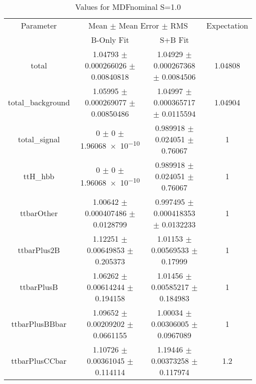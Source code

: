 \begin{table}
\centering
\caption{Values for MDFnominal S=1.0}
\begin{tabular}{cccc}
\toprule
Parameter & \multicolumn{2}{c}{Mean $\pm$ Mean Error $\pm$ RMS} & Expectation\\
 & B-Only Fit & S+B Fit & \\
\midrule
total & \num{1.04793} $\pm$ \num{0.000266026} $\pm$ \num{0.00840818} & \num{1.04929} $\pm$ \num{0.000267368} $\pm$ \num{0.0084506} & \num{1.04808}\\
total\_background & \num{1.05995} $\pm$ \num{0.000269077} $\pm$ \num{0.00850486} & \num{1.04997} $\pm$ \num{0.000365717} $\pm$ \num{0.0115594} & \num{1.04904}\\
total\_signal & \num{0} $\pm$ \num{0} $\pm$ \num{1.96068e-10} & \num{0.989918} $\pm$ \num{0.024051} $\pm$ \num{0.76067} & \num{1}\\
ttH\_hbb & \num{0} $\pm$ \num{0} $\pm$ \num{1.96068e-10} & \num{0.989918} $\pm$ \num{0.024051} $\pm$ \num{0.76067} & \num{1}\\
ttbarOther & \num{1.00642} $\pm$ \num{0.000407486} $\pm$ \num{0.0128799} & \num{0.997495} $\pm$ \num{0.000418353} $\pm$ \num{0.0132233} & \num{1}\\
ttbarPlus2B & \num{1.12251} $\pm$ \num{0.00649853} $\pm$ \num{0.205373} & \num{1.01153} $\pm$ \num{0.00569533} $\pm$ \num{0.17999} & \num{1}\\
ttbarPlusB & \num{1.06262} $\pm$ \num{0.00614244} $\pm$ \num{0.194158} & \num{1.01456} $\pm$ \num{0.00585217} $\pm$ \num{0.184983} & \num{1}\\
ttbarPlusBBbar & \num{1.09652} $\pm$ \num{0.00209202} $\pm$ \num{0.0661155} & \num{1.00034} $\pm$ \num{0.00306005} $\pm$ \num{0.0967089} & \num{1}\\
ttbarPlusCCbar & \num{1.10726} $\pm$ \num{0.00361045} $\pm$ \num{0.114114} & \num{1.19446} $\pm$ \num{0.00373258} $\pm$ \num{0.117974} & \num{1.2}\\
\bottomrule
\end{tabular}
\end{table}